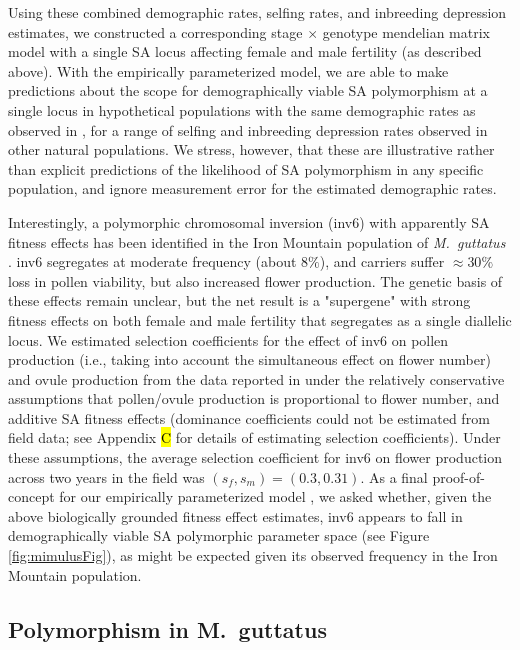 \documentclass[11pt]{article}
\begin{document}
Using these combined demographic rates, selfing rates, and inbreeding depression estimates, we constructed a corresponding stage $\times$ genotype mendelian matrix model with a single SA locus affecting female and male fertility (as described above). With the empirically parameterized model, we are able to make predictions about the scope for demographically viable SA polymorphism at a single locus in hypothetical populations with the same demographic rates as observed in \citet{PetersonEtAl2016}, for a range of selfing and inbreeding depression rates observed in other natural populations. We stress, however, that these are illustrative rather than explicit predictions of the likelihood of SA polymorphism in any specific population, and ignore measurement error for the estimated demographic rates.

Interestingly, a polymorphic chromosomal inversion (inv6) with apparently SA fitness effects has been identified in the Iron Mountain population of {\itshape M.~guttatus} \citep{LeeKelly2015}. inv6 segregates at moderate frequency (about $8\%$), and carriers suffer $\approx 30 \%$ loss in pollen viability, but also increased flower production. The genetic basis of these effects remain unclear, but the net result is a "supergene" with strong fitness effects on both female and male fertility that segregates as a single diallelic locus. We estimated selection coefficients for the effect of inv6 on pollen production (i.e., taking into account the simultaneous effect on flower number) and ovule production from the data reported in \citet{LeeKelly2015} under the relatively conservative assumptions that pollen/ovule production is proportional to flower number, and  additive SA fitness effects (dominance coefficients could not be estimated from field data; see Appendix \hl{C} for details of estimating selection coefficients). Under these assumptions, the average selection coefficient for inv6 on flower production across two years in the field was $(s_f,s_m) = (0.3,0.31)$. As a final proof-of-concept for our empirically parameterized model \citep[e.g.,][]{Servedio2014}, we asked whether, given the above biologically grounded fitness effect estimates, inv6 appears to fall in demographically viable SA polymorphic parameter space (see Figure \ref{fig:mimulusFig}), as might be expected given its observed frequency in the Iron Mountain population.


\subsection*{Polymorphism in M.~guttatus} \label{sec:Mgutt}
\end{document}
